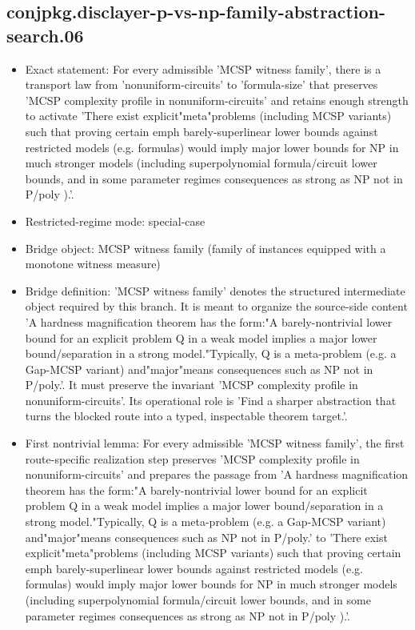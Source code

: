 \documentclass[11pt]{article}
\begin{document}
\subsection*{conjpkg.disclayer-p-vs-np-family-abstraction-search.06}
\begin{itemize}
\item Exact statement: For every admissible 'MCSP witness family', there is a transport law from 'nonuniform-circuits' to 'formula-size' that preserves 'MCSP complexity profile in nonuniform-circuits' and retains enough strength to activate 'There exist explicit"meta"problems (including MCSP variants) such that proving certain emph barely-superlinear lower bounds against restricted models (e.g. formulas) would imply major lower bounds for NP in much stronger models (including superpolynomial formula/circuit lower bounds, and in some parameter regimes consequences as strong as NP not in P/poly ).'.
\item Restricted-regime mode: special-case
\item Bridge object: MCSP witness family (family of instances equipped with a monotone witness measure)
\item Bridge definition: 'MCSP witness family' denotes the structured intermediate object required by this branch. It is meant to organize the source-side content 'A hardness magnification theorem has the form:"A barely-nontrivial lower bound for an explicit problem Q in a weak model implies a major lower bound/separation in a strong model."Typically, Q is a meta-problem (e.g. a Gap-MCSP variant) and"major"means consequences such as NP not in P/poly.'. It must preserve the invariant 'MCSP complexity profile in nonuniform-circuits'. Its operational role is 'Find a sharper abstraction that turns the blocked route into a typed, inspectable theorem target.'.
\item First nontrivial lemma: For every admissible 'MCSP witness family', the first route-specific realization step preserves 'MCSP complexity profile in nonuniform-circuits' and prepares the passage from 'A hardness magnification theorem has the form:"A barely-nontrivial lower bound for an explicit problem Q in a weak model implies a major lower bound/separation in a strong model."Typically, Q is a meta-problem (e.g. a Gap-MCSP variant) and"major"means consequences such as NP not in P/poly.' to 'There exist explicit"meta"problems (including MCSP variants) such that proving certain emph barely-superlinear lower bounds against restricted models (e.g. formulas) would imply major lower bounds for NP in much stronger models (including superpolynomial formula/circuit lower bounds, and in some parameter regimes consequences as strong as NP not in P/poly ).'.

\end{itemize}
\end{document}
